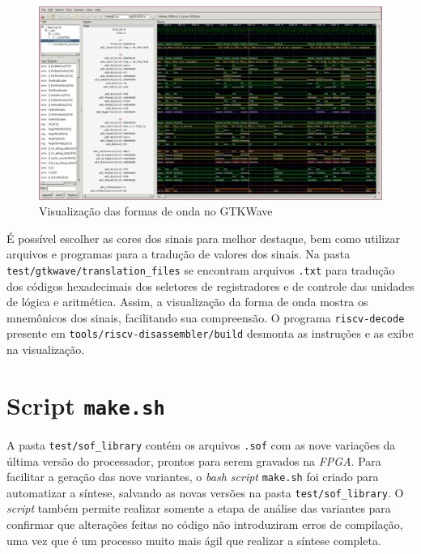     \begin{figure}[H]
    \centering
        \includegraphics[width=.9\linewidth]{../images/gtkwave/random.png}
        \caption{Visualização das formas de onda no GTKWave}
        \label{fig:gtkwave_generic}
    \end{figure}

    { É possível escolher as cores dos sinais para melhor destaque, bem como
        utilizar arquivos e programas para a tradução de valores dos sinais.
        Na pasta \texttt{test/gtkwave/translation\_files} se encontram arquivos
        \texttt{.txt} para tradução dos códigos hexadecimais dos seletores de
        registradores e de controle das unidades de lógica e aritmética. Assim,
        a visualização da forma de onda mostra os mnemônicos dos sinais, facilitando
        sua compreensão. O programa \texttt{riscv-decode} presente em
        \texttt{tools/riscv-disassembler/build} desmonta as instruções e as exibe
        na visualização.
    }


\section{Script \texttt{make.sh}}
    { A pasta \texttt{test/sof\_library} contém os arquivos \texttt{.sof} com
        as nove variações da última versão do processador, prontos para serem
        gravados na \textit{FPGA}. Para facilitar a geração das nove variantes,
        o \textit{bash script} \texttt{make.sh} foi criado para automatizar a
        síntese, salvando as novas versões na pasta \texttt{test/sof\_library}.
        O \textit{script} também permite realizar somente a etapa de
        análise das variantes para confirmar que alterações feitas no código não
        introduziram erros de compilação, uma vez que é um processo muito mais
        ágil que realizar a síntese completa.
    }

